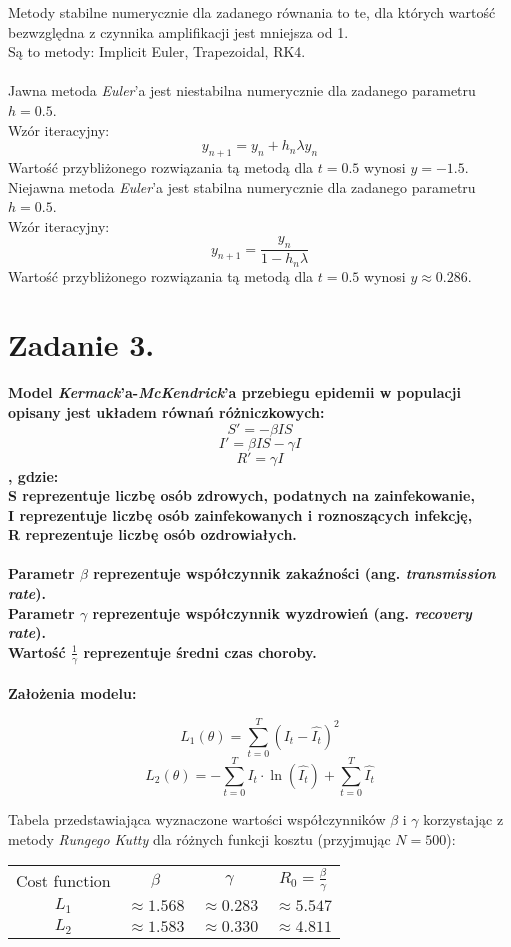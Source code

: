 \documentclass{article}
\begin{document}
Metody stabilne numerycznie dla zadanego równania to te, dla których
wartość bezwzględna z czynnika amplifikacji jest mniejsza od 1.\\
Są to metody: Implicit Euler, Trapezoidal, RK4.\\\\

Jawna metoda \textit{Euler}'a jest niestabilna numerycznie dla zadanego
parametru $h=0.5$.\\
Wzór iteracyjny:
$$y_{n+1} = y_n + h_n\lambda y_n$$
Wartość przybliżonego rozwiązania tą metodą dla $t=0.5$ wynosi
$y=-1.5$.\\


Niejawna metoda \textit{Euler}'a jest stabilna numerycznie dla zadanego
parametru $h=0.5$.\\
Wzór iteracyjny:
$$y_{n+1} = \frac{y_n}{1 - h_n\lambda}$$
Wartość przybliżonego rozwiązania tą metodą dla $t=0.5$ wynosi
$y\approx 0.286$.\\



\section*{Zadanie 3.}
\textbf{Model \textit{Kermack}’a-\textit{McKendrick}’a przebiegu epidemii w populacji
opisany jest układem równań różniczkowych:
$$S'=-\beta I S$$
$$I'=\beta I S - \gamma I$$
$$R'=\gamma I$$
, gdzie: \\
S reprezentuje liczbę osób zdrowych, podatnych na zainfekowanie,\\
I reprezentuje liczbę osób zainfekowanych i roznoszących infekcję,\\
R reprezentuje liczbę osób ozdrowiałych.\\\\
Parametr $\beta$ reprezentuje współczynnik zakaźności (ang. \textit{transmission rate}).\\
Parametr $\gamma$ reprezentuje współczynnik wyzdrowień (ang. \textit{recovery rate}).\\
Wartość $\frac{1}{\gamma}$ reprezentuje średni czas choroby. \\\\
Założenia modelu:
}

$$L_1(\theta) = \sum_{t=0}^{T} (I_t - \hat{I_t})^2$$
$$L_2(\theta) = -\sum_{t=0}^{T} I_t\cdot \ln(\hat{I_t}) + 
\sum_{t=0}^{T} \hat{I_t}$$

Tabela przedstawiająca wyznaczone wartości współczynników $\beta$ i $\gamma$
korzystając z metody \textit{Rungego Kutty} dla różnych
funkcji kosztu (przyjmując $N=500$):
\begin{center}
  \begin{tabular}{c c c c} 
   Cost function & $\beta$ & $\gamma$ & $R_0 = \frac{\beta}{\gamma}$\\
   $L_1$ & $\approx1.568$ & $\approx0.283$ & $\approx5.547$\\
   $L_2$ & $\approx1.583$ & $\approx0.330$ & $\approx4.811$
  \end{tabular}
\end{center}
\end{document}
